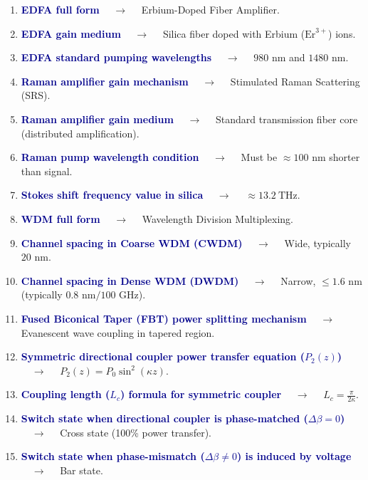 \documentclass[11pt,a4paper]{article}
\begin{document}
\begin{enumerate}[label=\arabic*., leftmargin=*, labelsep=0.8em, itemsep=0.35em, parsep=0.1em, topsep=0.2em]
  \item \textcolor{darkblue}{\textbf{EDFA full form}} $\quad\to\quad$ Erbium-Doped Fiber Amplifier.
  \item \textcolor{darkblue}{\textbf{EDFA gain medium}} $\quad\to\quad$ Silica fiber doped with Erbium ($\text{Er}^{3+}$) ions.
  \item \textcolor{darkblue}{\textbf{EDFA standard pumping wavelengths}} $\quad\to\quad$ $980\text{ nm}$ and $1480\text{ nm}$.
  \item \textcolor{darkblue}{\textbf{Raman amplifier gain mechanism}} $\quad\to\quad$ Stimulated Raman Scattering (SRS).
  \item \textcolor{darkblue}{\textbf{Raman amplifier gain medium}} $\quad\to\quad$ Standard transmission fiber core (distributed amplification).
  \item \textcolor{darkblue}{\textbf{Raman pump wavelength condition}} $\quad\to\quad$ Must be $\approx 100\text{ nm}$ shorter than signal.
  \item \textcolor{darkblue}{\textbf{Stokes shift frequency value in silica}} $\quad\to\quad$ $\approx 13.2\ \text{THz}$.
  \item \textcolor{darkblue}{\textbf{WDM full form}} $\quad\to\quad$ Wavelength Division Multiplexing.
  \item \textcolor{darkblue}{\textbf{Channel spacing in Coarse WDM (CWDM)}} $\quad\to\quad$ Wide, typically $20\text{ nm}$.
  \item \textcolor{darkblue}{\textbf{Channel spacing in Dense WDM (DWDM)}} $\quad\to\quad$ Narrow, $\le 1.6\text{ nm}$ (typically $0.8\text{ nm}/100\text{ GHz}$).
  \item \textcolor{darkblue}{\textbf{Fused Biconical Taper (FBT) power splitting mechanism}} $\quad\to\quad$ Evanescent wave coupling in tapered region.
  \item \textcolor{darkblue}{\textbf{Symmetric directional coupler power transfer equation ($P_2(z)$)}} $\quad\to\quad$ $P_2(z) = P_0 \sin^2(\kappa z)$.
  \item \textcolor{darkblue}{\textbf{Coupling length ($L_c$) formula for symmetric coupler}} $\quad\to\quad$ $L_c = \frac{\pi}{2\kappa}$.
  \item \textcolor{darkblue}{\textbf{Switch state when directional coupler is phase-matched ($\Delta\beta=0$)}} $\quad\to\quad$ Cross state (100\% power transfer).
  \item \textcolor{darkblue}{\textbf{Switch state when phase-mismatch ($\Delta\beta \neq 0$) is induced by voltage}} $\quad\to\quad$ Bar state.

\end{enumerate}
\end{document}
